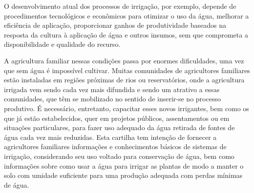 O desenvolvimento atual dos processos de irriga\c{c}\~{a}o, por exemplo, depende de procedimentos tecnol\'{o}gicos e econ\^{o}micos para otimizar o uso da \'{a}gua, melhorar a efici\^{e}ncia de aplica\c{c}\~{a}o, proporcionar ganhos de produtividade baseados na resposta da cultura \`{a} aplica\c{c}\~{a}o de \'{a}gua e outros insumos, sem que comprometa a disponibilidade e qualidade do recurso.

A agricultura familiar nessas condi\c{c}\~{o}es passa por enormes dificuldades, uma vez que sem \'{a}gua \'{e} imposs\'{i}vel cultivar. Muitas comunidades de agricultores familiares est\~{a}o instaladas em regi\~{o}es pr\'{o}ximas de rios ou reservat\'{o}rios, onde a agricultura irrigada vem sendo cada vez mais difundida e sendo um atrativo a essas comunidades, que t\^{e}m se mobilizado no sentido de inserir-se no processo produtivo. \'{E} necess\'{a}rio, entretanto, capacitar esses novos irrigantes, bem como os que j\'{a} est\~{a}o estabelecidos, quer em projetos p\'{u}blicos, assentamentos ou em situa\c{c}\~{o}es particulares, para fazer uso adequado da \'{a}gua retirada de fontes de \'{a}gua cada vez mais reduzidas. Esta cartilha tem inten\c{c}\~{a}o de fornecer a agricultores familiares informa\c{c}\~{o}es e conhecimentos b\'{a}sicos de sistemas de irriga\c{c}\~{a}o, considerando seu uso voltado para conserva\c{c}\~{a}o de \'{a}gua, bem como informa\c{c}\~{o}es sobre como usar a \'{a}gua para irrigar as plantas de modo a manter o solo com umidade suficiente para uma produ\c{c}\~{a}o adequada com perdas m\'{i}nimas de \'{a}gua. 

